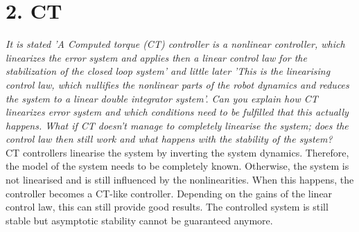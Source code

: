 \section*{2. CT}
\textit{It is stated 'A Computed torque (CT) controller is a nonlinear controller, which linearizes the error system and applies then a linear control law for the stabilization of the closed loop system' and little later 'This is the linearising control law, which nullifies the nonlinear parts of the robot dynamics and reduces the system to a linear double integrator system'. Can you explain how CT linearizes error system and which conditions need to be fulfilled that this actually happens. What if CT doesn't manage to completely linearise the system; does the control law then still work and what happens with the stability of the system?}\\
CT controllers linearise the system by inverting the system dynamics. Therefore, the model of the system needs to be completely known. Otherwise, the system is not linearised and is still influenced by the nonlinearities. When this happens, the controller becomes a CT-like controller. Depending on the gains of the linear control law, this can still provide good results. The controlled system is still stable but asymptotic stability cannot be guaranteed anymore.
